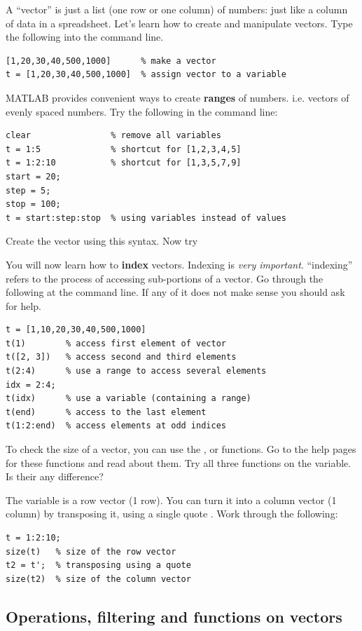 \documentclass{article}
\begin{document}
A ``vector'' is just a list (one row or one column) of numbers: just like a column of data in a spreadsheet.
Let's learn how to create and manipulate vectors.
Type the following into the command line.
\begin{lstlisting}
[1,20,30,40,500,1000]      % make a vector
t = [1,20,30,40,500,1000]  % assign vector to a variable
\end{lstlisting}

MATLAB provides convenient ways to create \textbf{ranges} of numbers. i.e. vectors of evenly spaced numbers.
Try the following in the command line:
\begin{lstlisting}
clear                % remove all variables
t = 1:5              % shortcut for [1,2,3,4,5]
t = 1:2:10           % shortcut for [1,3,5,7,9]
start = 20;
step = 5;
stop = 100;
t = start:step:stop  % using variables instead of values
\end{lstlisting}
Create the vector \mcode{[5,8,11,14]} using this syntax. Now try \mcode{[-1,-2,-3,-4]}

You will now learn how to \textbf{index} vectors.
Indexing is \emph{very important}.
``indexing'' refers to the process of accessing sub-portions of a vector.
Go through the following at the command line.
If any of it does not make sense you should ask for help.
\begin{lstlisting}
t = [1,10,20,30,40,500,1000]
t(1)        % access first element of vector
t([2, 3])   % access second and third elements
t(2:4)      % use a range to access several elements
idx = 2:4;
t(idx)      % use a variable (containing a range)
t(end)      % access to the last element
t(1:2:end)  % access elements at odd indices
\end{lstlisting}

To check the size of a vector, you can use the ,  or  functions.
Go to the help pages for these functions and read about them. 
Try all three functions on the  variable. Is their any difference?

\pagebreak
The variable  is a row vector (1 row).
You can turn it into a column vector (1 column) by transposing it, using a single quote .
Work through the following:
\begin{lstlisting}
t = 1:2:10;
size(t)   % size of the row vector
t2 = t';  % transposing using a quote
size(t2)  % size of the column vector
\end{lstlisting}


\subsection{Operations, filtering and functions on vectors}
\end{document}
